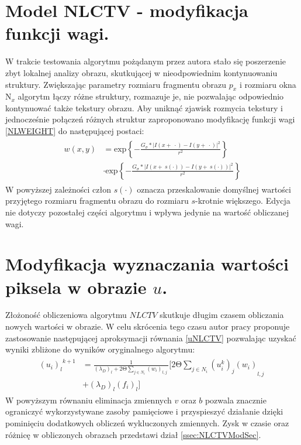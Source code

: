 \documentclass[12pt, twoside, openany]{report}
\theoremstyle{definition}
\begin{document}
\section{Model NLCTV - modyfikacja funkcji wagi.}
W trakcie testowania algorytmu pożądanym przez autora stało się poszerzenie zbyt lokalnej analizy obrazu, skutkującej w nieodpowiednim kontynuowaniu struktury. Zwiększając parametry rozmiaru fragmentu obrazu $p_x$ i rozmiaru okna $\text{N}_x$ algorytm łączy różne struktury, rozmazuje je, nie pozwalając odpowiednio kontynuować także tekstury obrazu. Aby uniknąć zjawisk rozmycia tekstury i jednocześnie połączeń różnych struktur zaproponowano modyfikację funkcji wagi \eqref{NLWEIGHT} do następującej postaci:
\begin{align}
\begin{aligned}
w\left(x,y\right) &= {\mathrm{exp} \left\{-\frac{G_{\sigma }*{\left|I\left(x+\ \cdot \right)-I\left(y+\ \cdot \right)\right|}^2}{r^2}\right\} }\\
&\cdot {\mathrm{exp} \left\{-\frac{G_{\sigma }*{\left|I\left(x+\ s(\cdot) \right)-I\left(y+\ s(\cdot) \right)\right|}^2}{r^2}\right\} }
\label{NLWEIGHTMODIFIED}
\end{aligned}
\end{align}
W powyższej zależności człon $s(\cdot)$ oznacza przeskalowanie  domyślnej wartości przyjętego rozmiaru fragmentu obrazu do rozmiaru $s$-krotnie większego. Edycja nie dotyczy pozostałej części  algorytmu i wpływa jedynie na wartość obliczanej wagi.
\section{Modyfikacja wyznaczania wartości piksela w obrazie $u$.}
Złożoność obliczeniowa algorytmu $NLCTV$ skutkuje długim czasem obliczania nowych wartości w obrazie. W celu skrócenia tego czasu autor pracy proponuje zastosowanie następującej aproksymacji równania \eqref{uNLCTV} pozwalając uzyskać wyniki zbliżone  do wyników oryginalnego algorytmu:
\begin{align}
\begin{aligned}
{{\left(u_i\right)}_l}^{k+1} &= \frac{1}{{\left({\lambda }_D\right)}_l+2\mathrm{\Theta} \sum\limits_{j\in N_i} {\left(w_i\right)}_{l,j}\ } \Biggl[2\mathrm{\Theta }\sum_{j\in N_i} {{{\left(u^k_i\right)}_j\left(w_i\right)}_{l,j}\ }\\
&+ {\left({\lambda }_D\right)}_l{\left(f_i\right)}_l\Biggr]
\end{aligned}
\label{NLH1}
\end{align}
W powyższym równaniu eliminacja zmiennych $v$ oraz $b$ pozwala znacznie ograniczyć wykorzystywane zasoby pamięciowe i przyspieszyć działanie dzięki pominięciu dodatkowych obliczeń wykluczonych zmiennych. Zysk w czasie oraz różnicę w obliczonych obrazach przedstawi dział \ref{ssec:NLCTVModSec}.
\end{document}
